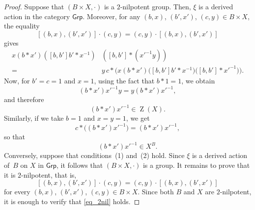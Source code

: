 \documentclass[reqno,hidelinks,a4paper]{amsart}
\theoremstyle{plain}
\theoremstyle{definition}
\theoremstyle{remark}
\numberwithin{equation}{section}
\DeclareMathOperator{\bZ}{Z}
\newcommand{\Grp}{\ensuremath{\mathsf{Grp}}}
\begin{document}
\begin{proof}
    Suppose that \((B \times X,\cdot)\) is a \(2\)-nilpotent group. Then, \(\xi\) is a derived action in the category \(\Grp\). Moreover, for any \((b,x)\), \((b',x')\), \((c,y)\in B\times X\), the equality
    \[
        [(b,x),(b',x')] \cdot (c,y)=(c,y) \cdot [(b,x),(b',x')]
    \]
    gives
    \begin{equation}\label{eq_2nil}
        \begin{split}
            x(b \ast x')([b,b']b' \ast x^{-1}) & ([b,b'] \ast (x'^{-1}y))                                                                            \\
            =                                  & y\, c \ast \bigl(x(b \ast x')\bigl([b,b']b' \ast x^{-1}\bigr)\bigl([b,b'] \ast x'^{-1}\bigr)\bigr).
        \end{split}
    \end{equation}
    Now, for \(b'=c=1\) and \(x=1\), using the fact that \(b \ast 1=1\), we obtain
    \[
        (b \ast x')x'^{-1}y=y(b \ast x')x'^{-1},
    \]
    and therefore
    \[
        (b \ast x')x'^{-1}\in \bZ(X).
    \]
    Similarly, if we take \(b=1\) and \(x=y=1\), we get
    \[
        c \ast \bigl((b \ast x')x'^{-1}\bigr)=(b \ast x')x'^{-1},
    \]
    so that
    \[
        (b \ast x')x'^{-1}\in X^B.
    \]
    Conversely, suppose that conditions~(1) and~(2) hold. Since \(\xi\) is a derived action of~\(B\) on \(X\) in \(\Grp\), it follows that \((B \times X,\cdot)\) is a group. It remains to prove that it is \(2\)-nilpotent, that is,
    \[
        [(b,x),(b',x')] \cdot (c,y)=(c,y)\cdot [(b,x),(b',x')]
    \]
    for every \((b,x)\), \((b',x')\), \((c,y)\in B\times X\). Since both \(B\) and \(X\) are \(2\)-nilpotent, it is enough to verify that \eqref{eq_2nil} holds.


\end{proof}
\end{document}
